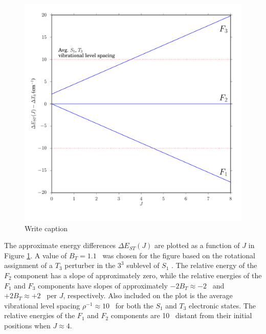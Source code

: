 \documentclass[12pt]{mitthesis}
\begin{document}
\begin{figure}
  \caption{Write caption }
  \label{fig:rotational-energy-differences}
  \centering
  \includegraphics[width=6in]{rotational-energy-differences.pdf}
\end{figure}

The approximate energy differences $\Delta E_{ST}(J)$ are plotted as a
function of $J$ in Figure \ref{fig:rotational-energy-differences}.  A
value of $B_T=1.1$ \rcm\ was chosen for the figure based on the
rotational assignment of a $T_3$ perturber in the $3^3$ 
sublevel of $S_1$ \cite{mishra04}.  The relative energy of the $F_2$
component has a slope of approximately zero, while the relative
energies of the $F_1$ and $F_3$ components have slopes of
approximately $-2B_T \approx -2$ \rcm\ and $+2B_T \approx +2$ \rcm\
per $J$, respectively.  Also included on the plot is the average
vibrational level spacing $\rho^{-1} \approx 10$ \rcm\ for both the
$S_1$ and $T_3$ electronic states.  The relative energies of the $F_1$
and $F_2$ components are 10 \rcm\ distant from their initial positions
when $J \approx 4$.
\end{document}
